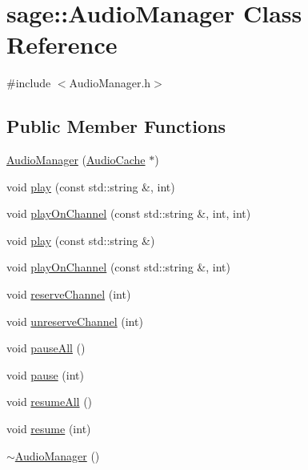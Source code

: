 \hypertarget{classsage_1_1AudioManager}{}\section{sage\+::Audio\+Manager Class Reference}
\label{classsage_1_1AudioManager}


{\ttfamily \#include $<$Audio\+Manager.\+h$>$}

\subsection*{Public Member Functions}
\begin{DoxyCompactItemize}
\item 
\mbox{\hyperlink{classsage_1_1AudioManager_a95f2ed16e4c7fdb2396624d45b398b00}{Audio\+Manager}} (\mbox{\hyperlink{classsage_1_1AudioCache}{Audio\+Cache}} $\ast$)
\item 
void \mbox{\hyperlink{classsage_1_1AudioManager_a251df80c76c4c4031015c4681a2d0c0f}{play}} (const std\+::string \&, int)
\item 
void \mbox{\hyperlink{classsage_1_1AudioManager_a8393c79d76763795c835c0a636a8a8f3}{play\+On\+Channel}} (const std\+::string \&, int, int)
\item 
void \mbox{\hyperlink{classsage_1_1AudioManager_a09ed800755c7d35a12a889319494b798}{play}} (const std\+::string \&)
\item 
void \mbox{\hyperlink{classsage_1_1AudioManager_a928db254848a8eb2536ba065a0b719d3}{play\+On\+Channel}} (const std\+::string \&, int)
\item 
void \mbox{\hyperlink{classsage_1_1AudioManager_a02e449fb8c3d797336a17781a4d1abd4}{reserve\+Channel}} (int)
\item 
void \mbox{\hyperlink{classsage_1_1AudioManager_a96ab7e1b8ea7f52a6cd09675efb042eb}{unreserve\+Channel}} (int)
\item 
void \mbox{\hyperlink{classsage_1_1AudioManager_aae16a9d852718c100659b185f86533b3}{pause\+All}} ()
\item 
void \mbox{\hyperlink{classsage_1_1AudioManager_a6e851147d522d6dc255fc0b1f0134832}{pause}} (int)
\item 
void \mbox{\hyperlink{classsage_1_1AudioManager_a295fca304a8dbd5d1e3c788a20d8e838}{resume\+All}} ()
\item 
void \mbox{\hyperlink{classsage_1_1AudioManager_a694c3a19eed23e395d3d03a9b4af5cdc}{resume}} (int)
\item 
\mbox{\hyperlink{classsage_1_1AudioManager_ad94dc46723c6d7cf8c81fc3772a842aa}{$\sim$\+Audio\+Manager}} ()
\end{DoxyCompactItemize}
